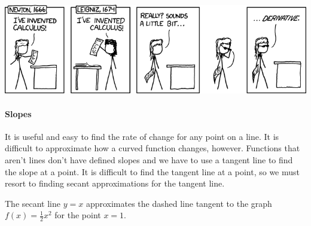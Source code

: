 \documentclass[../revisedmain.tex]{subfiles}
\begin{document}
\vspace{.125in}
\includegraphics[width=\textwidth]{newton.png}\\\vspace{.25in}
\paragraph{Slopes} It is useful and easy to find the rate of change for any point on a line. It is difficult to approximate how a curved function changes, however. Functions that aren't lines don't have defined slopes and we have to use a tangent line to find the slope at a point. It is difficult to find the tangent line at a point, so we must resort to finding secant approximations for the tangent line.
\begin{center}
\par The secant line $y=x$ approximates the dashed line tangent to the graph $f(x)=\frac{1}{2} x^2$ for the point $x=1$.
\end{center}
\end{document}

